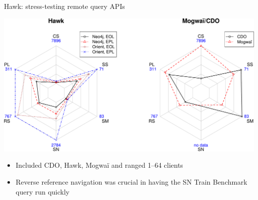 \documentclass[10pt]{beamer}
\begin{document}
\begin{frame}{Hawk: stress-testing remote query APIs~\cite{sosym-stress-2017}}

  \begin{center}
    \includegraphics[width=\textwidth]{rq3-comparison-tb}
  \end{center}

  \begin{itemize}
  \item Included CDO, Hawk, Mogwaï and ranged 1--64 clients
  \item Reverse reference navigation was crucial in having the
    SN Train Benchmark~\cite{trainbenchmark} query run quickly
  \end{itemize}

\end{frame}
\end{document}
